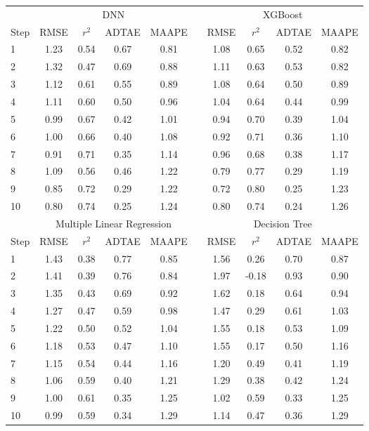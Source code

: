 \documentclass[]{interact}
\theoremstyle{plain}%
\theoremstyle{definition}
\theoremstyle{remark}
\begin{document}
\begin{table}[H]
{\begin{tabular}{lccccccccc} \toprule
  &  \multicolumn{4}{c}{DNN}  & \multicolumn{1}{c}{\quad} &  \multicolumn{4}{c}{XGBoost} \\ \cmidrule{2-10}
 Step  &  RMSE  &  $r^2$  &  ADTAE & MAAPE & \quad &  RMSE  &  $r^2$  &  ADTAE & MAAPE \\ \midrule
1 & 1.23 & 0.54 & 0.67 & 0.81 & \quad & 1.08 & 0.65 & 0.52 & 0.82 \\
2 & 1.32 & 0.47 & 0.69 & 0.88 & \quad & 1.11 & 0.63 & 0.53 & 0.82 \\
3 & 1.12 & 0.61 & 0.55 & 0.89 & \quad & 1.08 & 0.64 & 0.50 & 0.89 \\
4 & 1.11 & 0.60 & 0.50 & 0.96 & \quad & 1.04 & 0.64 & 0.44 & 0.99 \\
5 & 0.99 & 0.67 & 0.42 & 1.01 & \quad & 0.94 & 0.70 & 0.39 & 1.04 \\
6 & 1.00 & 0.66 & 0.40 & 1.08 & \quad & 0.92 & 0.71 & 0.36 & 1.10 \\
7 & 0.91 & 0.71 & 0.35 & 1.14 & \quad & 0.96 & 0.68 & 0.38 & 1.17 \\
8 & 1.09 & 0.56 & 0.46 & 1.22 & \quad & 0.79 & 0.77 & 0.29 & 1.19 \\
9 & 0.85 & 0.72 & 0.29 & 1.22 & \quad & 0.72 & 0.80 & 0.25 & 1.23 \\
10 & 0.80 & 0.74 & 0.25 & 1.24 & \quad & 0.80 & 0.74 & 0.24 & 1.26 \\
\bottomrule
  &  \multicolumn{4}{c}{Multiple Linear Regression}  & \multicolumn{1}{c}{\quad} &  \multicolumn{4}{c}{Decision Tree} \\ \cmidrule{2-10}
 Step  &  RMSE  &  $r^2$  &  ADTAE & MAAPE & \quad &  RMSE  &  $r^2$  &  ADTAE & MAAPE \\ \midrule
1 & 1.43 & 0.38 & 0.77 & 0.85 & \quad & 1.56 & 0.26 & 0.70 & 0.87  \\
2 & 1.41 & 0.39 & 0.76 & 0.84 & \quad & 1.97 & -0.18 & 0.93 & 0.90 \\
3 & 1.35 & 0.43 & 0.69 & 0.92 & \quad & 1.62 & 0.18 & 0.64 & 0.94  \\
4 & 1.27 & 0.47 & 0.59 & 0.98 & \quad & 1.47 & 0.29 & 0.61 & 1.03  \\
5 & 1.22 & 0.50 & 0.52 & 1.04 & \quad & 1.55 & 0.18 & 0.53 & 1.09  \\
6 & 1.18 & 0.53 & 0.47 & 1.10 & \quad & 1.55 & 0.17 & 0.50 & 1.16  \\
7 & 1.15 & 0.54 & 0.44 & 1.16 & \quad & 1.20 & 0.49 & 0.41 & 1.19  \\
8 & 1.06 & 0.59 & 0.40 & 1.21 & \quad & 1.29 & 0.38 & 0.42 & 1.24  \\
9 & 1.00 & 0.61 & 0.35 & 1.25 & \quad & 1.02 & 0.59 & 0.33 & 1.25  \\
10 & 0.99 & 0.59 & 0.34 & 1.29 & \quad & 1.14 & 0.47 & 0.36 & 1.29  \\
\bottomrule
\end{tabular}}
\label{table:DwellTimePrediction}
\end{table}
\end{document}
